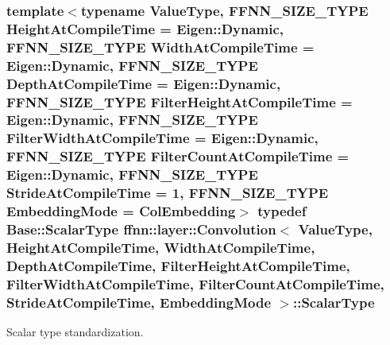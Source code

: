 \hypertarget{classffnn_1_1layer_1_1_convolution_a142c2bcfa2f5a5aad567d3c278e1f46f}{
\subsubsection[{Scalar\-Type}]{\setlength{\rightskip}{0pt plus 5cm}template$<$typename Value\-Type, F\-F\-N\-N\-\_\-\-S\-I\-Z\-E\-\_\-\-T\-Y\-P\-E Height\-At\-Compile\-Time = Eigen\-::\-Dynamic, F\-F\-N\-N\-\_\-\-S\-I\-Z\-E\-\_\-\-T\-Y\-P\-E Width\-At\-Compile\-Time = Eigen\-::\-Dynamic, F\-F\-N\-N\-\_\-\-S\-I\-Z\-E\-\_\-\-T\-Y\-P\-E Depth\-At\-Compile\-Time = Eigen\-::\-Dynamic, F\-F\-N\-N\-\_\-\-S\-I\-Z\-E\-\_\-\-T\-Y\-P\-E Filter\-Height\-At\-Compile\-Time = Eigen\-::\-Dynamic, F\-F\-N\-N\-\_\-\-S\-I\-Z\-E\-\_\-\-T\-Y\-P\-E Filter\-Width\-At\-Compile\-Time = Eigen\-::\-Dynamic, F\-F\-N\-N\-\_\-\-S\-I\-Z\-E\-\_\-\-T\-Y\-P\-E Filter\-Count\-At\-Compile\-Time = Eigen\-::\-Dynamic, F\-F\-N\-N\-\_\-\-S\-I\-Z\-E\-\_\-\-T\-Y\-P\-E Stride\-At\-Compile\-Time = 1, F\-F\-N\-N\-\_\-\-S\-I\-Z\-E\-\_\-\-T\-Y\-P\-E Embedding\-Mode = Col\-Embedding$>$ typedef {\bf Base\-::\-Scalar\-Type} {\bf ffnn\-::layer\-::\-Convolution}$<$ Value\-Type, Height\-At\-Compile\-Time, Width\-At\-Compile\-Time, Depth\-At\-Compile\-Time, Filter\-Height\-At\-Compile\-Time, Filter\-Width\-At\-Compile\-Time, Filter\-Count\-At\-Compile\-Time, Stride\-At\-Compile\-Time, {\bf Embedding\-Mode} $>$\-::{\bf Scalar\-Type}}}\label{classffnn_1_1layer_1_1_convolution_a142c2bcfa2f5a5aad567d3c278e1f46f}


Scalar type standardization. 


